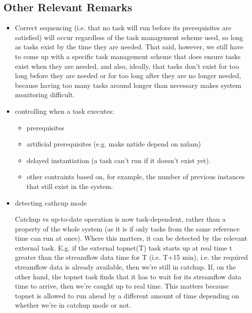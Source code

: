 \documentclass[12pt]{article}
\begin{document}
\subsection{Other Relevant Remarks}

\begin{itemize}

\item Correct sequencing (i.e. that no task will run before its
prerequisites are satisfied) will occur regardless of the task
management scheme used, so long as tasks exist by the time they are
needed.  That said, however, we still have to come up with a specific
task management scheme that does ensure tasks exist when they are
needed, and also, ideally, that tasks don't exist for too long before
they are needed or for too long after they are no longer needed, because
having too many tasks around longer than necessary makes system
monitoring difficult.

\item controlling when a task executes:
\begin{itemize}
 \item  prerequisites
 \item artificial prerequisites (e.g. make nztide depend on nzlam)
 \item delayed instantiation (a task can't run if it doesn't exist yet).
 \item other contraints based on, for example, the number of previous instances
       that still exist in the system.
\end{itemize}

\item{detecting cathcup mode}

Catchup vs up-to-date operation is now task-dependent, rather than a
property of the whole system (as it is if only tasks from the same
reference time can run at once).  Where this matters, it can be detected
by the relevant external task. E.g. if the external topnet(T) task
starts up at real time t greater than the streamflow data time for T
(i.e. T+15 min), i.e. the required streamflow data is already available,
then we're still in catchup. If, on the other hand, the topnet task
finds that it has to wait for its streamflow data time to arrive, then
we're caught up to real time.  This matters because topnet is allowed to
run ahead by a different amount of time depending on whether we're in
catchup mode or not.

\end{itemize}
\end{document}
